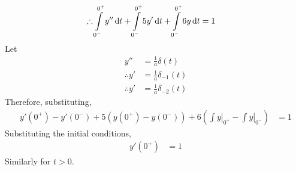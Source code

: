 \documentclass[fleqn, a4paper, 12pt, twoside]{article}
\theoremstyle{definition}
\theoremstyle{theorem}
\begin{document}
\begin{solution}
\begin{align*}
		\therefore \int\limits_{0^-}^{0^+} y'' \dif t + \int\limits_{0^-}^{0^+} 5 y' \dif t + \int\limits_{0^-}^{0^+} 6 y \dif t & = 1
	\end{align*}
	Let
	\begin{align*}
		y''           & = \frac{1}{a} \delta(t)      \\
		\therefore y' & = \frac{1}{a} \delta_{-1}(t) \\
		\therefore y' & = \frac{1}{a} \delta_{-2}(t)
	\end{align*}
	Therefore, substituting,
	\begin{align*}
		y'(0^+) - y'(0^-) + 5 \left( y(0^+) - y(0^-) \right) + 6 \left( \left. \int y \right|_{0^+} - \left. \int y \right|_{0^-} \right) & = 1
	\end{align*}
	Substituting the initial conditions,
	\begin{align*}
		y'(0^+) & = 1
	\end{align*}
	Similarly for $t > 0$.
\end{solution}
\end{document}
